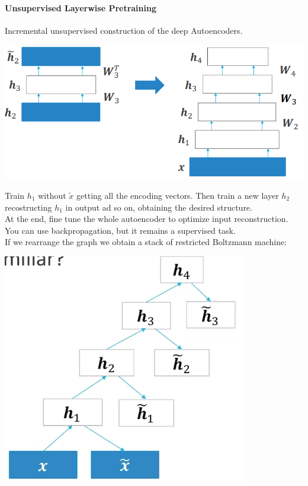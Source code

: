 \documentclass[10pt]{report}
\begin{document}
\paragraph{Unsupervised Layerwise Pretraining} Incremental unsupervised construction of the deep Autoencoders.
\begin{center}
	\includegraphics[scale=0.5]{80.png}
\end{center}
Train $h_1$ without $\tilde{x}$ getting all the encoding vectors. Then train a new layer $h_2$ recostructing $h_1$ in output ad so on, obtaining the desired structure.\\
At the end, fine tune the whole autoencoder to optimize input reconstruction. You can use backpropagation, but it remains a supervised task.\\
If we rearrange the graph we obtain a stack of restricted Boltzmann machine:\begin{center}
	\includegraphics[scale=0.5]{81.png}
\end{center}
\end{document}
